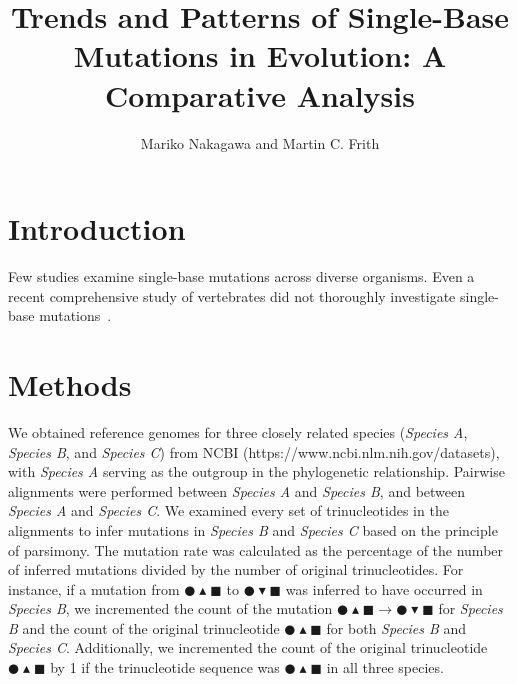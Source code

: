 \documentclass{article}
\title{Trends and Patterns of Single-Base Mutations in Evolution: A Comparative Analysis}
\author{Mariko Nakagawa and Martin C. Frith}
\date{}
\newcommand{\Cir}{\CIRCLE} %
\newcommand{\Tri}{\blacktriangle} %
\newcommand{\dTri}{\blacktriangledown} %
\newcommand{\Squ}{\blacksquare} %
\begin{document}
\maketitle

\section{Introduction}
Few studies examine single-base mutations across diverse organisms. Even a recent comprehensive study of vertebrates did not thoroughly investigate single-base mutations~\cite{bergeron2023evolution}.

\section{Methods}
We obtained reference genomes for three closely related species (\textit{Species A}, \textit{Species B}, and \textit{Species C}) from NCBI (https://www.ncbi.nlm.nih.gov/datasets), with \textit{Species A} serving as the outgroup in the phylogenetic relationship. Pairwise alignments were performed between \textit{Species A} and \textit{Species B}, and between \textit{Species A} and \textit{Species C}. We examined every set of trinucleotides in the alignments to infer mutations in \textit{Species B} and \textit{Species C} based on the principle of parsimony. The mutation rate was calculated as the percentage of the number of inferred mutations divided by the number of original trinucleotides. For instance, if a mutation from $\Cir\Tri\Squ$ to $\Cir\dTri\Squ$ was inferred to have occurred in \textit{Species B}, we incremented the count of the mutation $\Cir\Tri\Squ \rightarrow \Cir\dTri\Squ$ for \textit{Species B} and the count of the original trinucleotide $\Cir\Tri\Squ$ for both \textit{Species B} and \textit{Species C}. Additionally, we incremented the count of the original trinucleotide $\Cir\Tri\Squ$ by 1 if the trinucleotide sequence was $\Cir\Tri\Squ$ in all three species.
\end{document}

